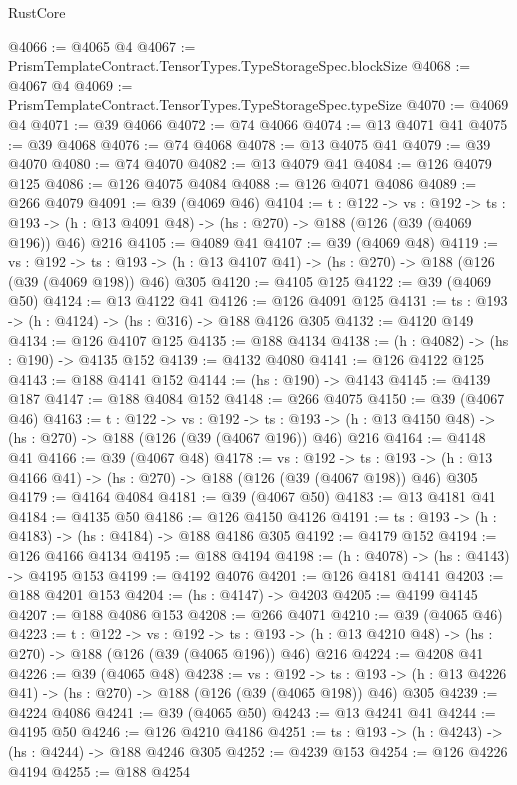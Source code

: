 \begin{lexlean}{RustCore}
\begin{coremodule}
@4066 := @4065 @4
@4067 := PrismTemplateContract.TensorTypes.TypeStorageSpec.blockSize
@4068 := @4067 @4
@4069 := PrismTemplateContract.TensorTypes.TypeStorageSpec.typeSize
@4070 := @4069 @4
@4071 := @39 @4066
@4072 := @74 @4066
@4074 := @13 @4071 @41
@4075 := @39 @4068
@4076 := @74 @4068
@4078 := @13 @4075 @41
@4079 := @39 @4070
@4080 := @74 @4070
@4082 := @13 @4079 @41
@4084 := @126 @4079 @125
@4086 := @126 @4075 @4084
@4088 := @126 @4071 @4086
@4089 := @266 @4079
@4091 := @39 (@4069 @46)
@4104 := {t : @122} ->
  {vs : @192} ->
  {ts : @193} -> (h : @13 @4091 @48) -> (hs : @270) -> @188 (@126 (@39 (@4069 @196)) @46) @216
@4105 := @4089 @41
@4107 := @39 (@4069 @48)
@4119 := {vs : @192} ->
  {ts : @193} -> (h : @13 @4107 @41) -> (hs : @270) -> @188 (@126 (@39 (@4069 @198)) @46) @305
@4120 := @4105 @125
@4122 := @39 (@4069 @50)
@4124 := @13 @4122 @41
@4126 := @126 @4091 @125
@4131 := {ts : @193} -> (h : @4124) -> (hs : @316) -> @188 @4126 @305
@4132 := @4120 @149
@4134 := @126 @4107 @125
@4135 := @188 @4134
@4138 := (h : @4082) -> (hs : @190) -> @4135 @152
@4139 := @4132 @4080
@4141 := @126 @4122 @125
@4143 := @188 @4141 @152
@4144 := (hs : @190) -> @4143
@4145 := @4139 @187
@4147 := @188 @4084 @152
@4148 := @266 @4075
@4150 := @39 (@4067 @46)
@4163 := {t : @122} ->
  {vs : @192} ->
  {ts : @193} -> (h : @13 @4150 @48) -> (hs : @270) -> @188 (@126 (@39 (@4067 @196)) @46) @216
@4164 := @4148 @41
@4166 := @39 (@4067 @48)
@4178 := {vs : @192} ->
  {ts : @193} -> (h : @13 @4166 @41) -> (hs : @270) -> @188 (@126 (@39 (@4067 @198)) @46) @305
@4179 := @4164 @4084
@4181 := @39 (@4067 @50)
@4183 := @13 @4181 @41
@4184 := @4135 @50
@4186 := @126 @4150 @4126
@4191 := {ts : @193} -> (h : @4183) -> (hs : @4184) -> @188 @4186 @305
@4192 := @4179 @152
@4194 := @126 @4166 @4134
@4195 := @188 @4194
@4198 := (h : @4078) -> (hs : @4143) -> @4195 @153
@4199 := @4192 @4076
@4201 := @126 @4181 @4141
@4203 := @188 @4201 @153
@4204 := (hs : @4147) -> @4203
@4205 := @4199 @4145
@4207 := @188 @4086 @153
@4208 := @266 @4071
@4210 := @39 (@4065 @46)
@4223 := {t : @122} ->
  {vs : @192} ->
  {ts : @193} -> (h : @13 @4210 @48) -> (hs : @270) -> @188 (@126 (@39 (@4065 @196)) @46) @216
@4224 := @4208 @41
@4226 := @39 (@4065 @48)
@4238 := {vs : @192} ->
  {ts : @193} -> (h : @13 @4226 @41) -> (hs : @270) -> @188 (@126 (@39 (@4065 @198)) @46) @305
@4239 := @4224 @4086
@4241 := @39 (@4065 @50)
@4243 := @13 @4241 @41
@4244 := @4195 @50
@4246 := @126 @4210 @4186
@4251 := {ts : @193} -> (h : @4243) -> (hs : @4244) -> @188 @4246 @305
@4252 := @4239 @153
@4254 := @126 @4226 @4194
@4255 := @188 @4254

\end{coremodule}
\end{lexlean}
